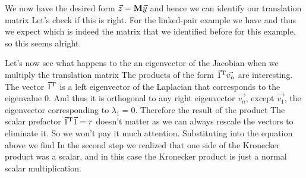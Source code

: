 We now have the desired form $\vec{z}={\bf M} \vec{y}$ and hence we can identify our translation matrix 
Let's check if this is right. For the linked-pair example we have 
and thus we expect 
which is indeed the matrix that we identified before for this example, so this seems alright. 

Let's now see what happens to the an eigenvector of the Jacobian when we multiply the translation matrix
The products of the form $\vec{1}^{\rm T}\vec{v_n}$ are interesting. The vector $\vec{1}^{\rm T}$ is a left eigenvector of the Laplacian that corresponds to the eigenvalue 0. And thus it is orthogonal to any right eigenvector $\vec{v_n}$, except $\vec{v_1}$, the eigenvector corresponding to $\lambda_1=0$. Therefore the result of the product 
The scalar prefactor $\vec{1}^{\rm T}\vec{1} = r$ doesn't matter as we can always rescale the vectors to eliminate it. So we won't pay it much attention. Substituting into the equation above we find 
In the second step we realized that one side of the Kronecker product was a scalar, and in this case the Kronecker product is just a normal scalar multiplication.

